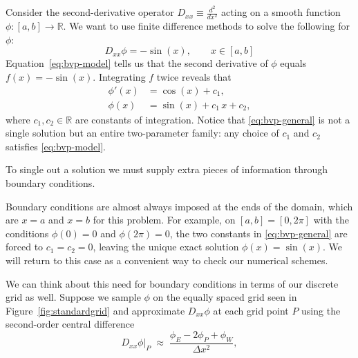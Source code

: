 Consider the second-derivative operator $D_{xx} \equiv \frac{d^2}{dx^2}$
acting on a smooth function $\phi : [a,b] \to \mathbb{R}$. We want to use finite difference methods to solve the following for $\phi$:
\begin{equation}
    D_{xx}\phi = -\sin(x), \qquad x \in [a,b]
    \label{eq:bvp-model}
\end{equation}
Equation~\eqref{eq:bvp-model} tells us that the second
derivative of $\phi$ equals $f(x) = -\sin(x)$. Integrating $f$ twice reveals that
\begin{align}
    \phi'(x) &= \cos(x) + c_1, \\
    \phi(x)  &= \sin(x) + c_1\,x + c_2,
    \label{eq:bvp-general}
\end{align}
where $c_1, c_2 \in \mathbb{R}$ are constants of integration. Notice that
\eqref{eq:bvp-general} is not a single solution but an entire
two-parameter family: any choice of $c_1$ and $c_2$ satisfies
\eqref{eq:bvp-model}. 


\begin{remark}
To single out a solution we must supply extra pieces of
information through boundary conditions.
\end{remark}

Boundary conditions are almost always imposed at the ends of the domain, which are $x=a$ and $x=b$ for this problem. For example, on $[a,b] = [0, 2\pi]$ with the conditions $\phi(0)=0$ and
$\phi(2\pi)=0$, the two constants in \eqref{eq:bvp-general} are forced to
$c_1 = c_2 = 0$, leaving the unique exact solution $\phi(x) = \sin(x)$.
We will return to this case as a convenient way to check our numerical
schemes.

We can think about this need for boundary conditions in terms of our discrete grid as well. Suppose we sample $\phi$ on the equally spaced grid seen in Figure~\ref{fig:standardgrid} and approximate
$D_{xx}\phi$ at each grid point $P$ using the second-order central difference
\begin{equation}
    D_{xx}\phi\big|_{P}
    \;\approx\;
    \frac{\phi_{E} - 2\phi_P + \phi_{W}}{\Delta x^2},
    \label{eq:bvp-central}
\end{equation}

